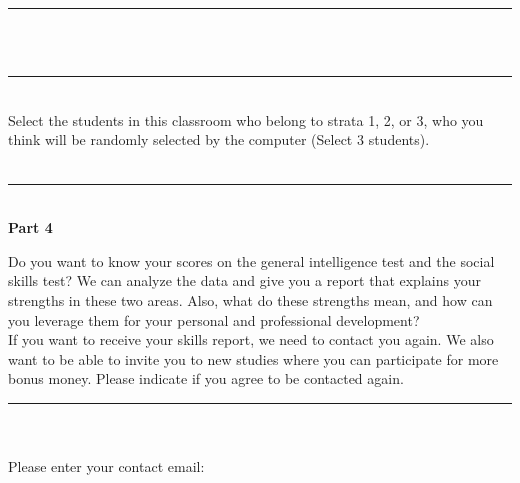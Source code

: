 \documentclass[11pt,a4paper,oneside]{article}
\begin{document}
\noindent\rule{\textwidth}{0.4pt}\\

 \\

\noindent\rule{\textwidth}{0.4pt}\\

\noindent Select the students in this classroom who belong to strata 1, 2, or 3, who you think will be randomly selected by the computer (Select 3 students). \\

\\

\noindent\rule{\textwidth}{0.4pt}\\

\noindent \textbf{Part 4}

\noindent Do you want to know your scores on the general intelligence test and the social skills test? We can analyze the data and give you a report that explains your strengths in these two areas. Also, what do these strengths mean, and how can you leverage them for your personal and professional development? \\

\noindent If you want to receive your skills report, we need to contact you again. We also want to be able to invite you to new studies where you can participate for more bonus money. Please indicate if you agree to be contacted again. \\


\noindent\rule{\textwidth}{0.4pt}\\

 \\

\noindent Please enter your contact email: \\

\\
\end{document}
